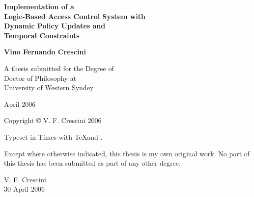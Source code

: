\documentclass[11pt]{report}
\newenvironment{vcopyright}
{
  \thispagestyle{empty}
  \vspace*{\stretch{10}}
  \begin{center}
}
{
  \end{center}
  \vspace*{\stretch{2}}
  \clearpage
}
\newenvironment{vcertificate}
{
  \thispagestyle{empty}
  \vspace*{\stretch{8}}
}
{
  \vspace*{\stretch{10}}
  \cleardoublepage
}
\begin{document}
  \onehalfspacing


  \pagestyle{fancy}

  \begin{titlepage}
    \begin{center}

      {
        \huge \bf
        Implementation of a \\
        Logic-Based Access Control System with \\
        Dynamic Policy Updates and \\
        Temporal Constraints \\
      }


      {
        \Large \bf
        Vino Fernando Crescini
      }


      {
        \Large
        A thesis submitted for the Degree of \\
        Doctor of Philosophy at \\
        University of Western Syndey \\
      }


      {
        \Large
        April 2006
      }

    \end{center}
  \end{titlepage}

  \begin{vcopyright}
    Copyright \copyright \space
    V. F. Crescini
    2006

    \vspace{1em}

    \small
    Typeset in Times with \TeX \space and \LaTeXe.
  \end{vcopyright}

  \begin{vcertificate}
    \noindent
    Except where otherwise indicated, this thesis is my own original work.
    No part of this thesis has been submitted as part of any other degree.

    \vspace{5em}

    \noindent
    V. F. Crescini \\
    30 April 2006
  \end{vcertificate}
\end{document}
